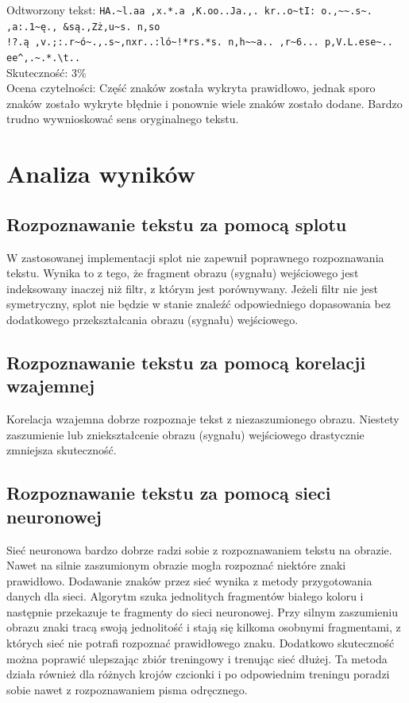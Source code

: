 \documentclass{article}
\begin{document}
Odtworzony tekst: \verb|HA.~l.aa ,x.*.a ,K.oo..Ja.,. kr..o~tI: o.,~~.s~. ,a:.1~ę., &są.,Zż,u~s. n,so| \\
\verb|!?.ą ,v.;:.r~ó~.,.s~,nxr..:ló~!*rs.*s. n,h~~a.. ,r~6... p,V.L.ese~.. ee^,.~.*.\t..| \\
Skuteczność: 3\% \\
Ocena czytelności: Część znaków została wykryta prawidłowo, jednak sporo znaków zostało wykryte błędnie i ponownie wiele znaków zostało dodane. Bardzo trudno wywnioskować sens oryginalnego tekstu.

\clearpage

\section{Analiza wyników}
\subsection{Rozpoznawanie tekstu za pomocą splotu}
W zastosowanej implementacji splot nie zapewnił poprawnego rozpoznawania tekstu. Wynika to z tego, że fragment obrazu (sygnału) wejściowego jest indeksowany inaczej niż filtr, z którym jest porównywany. Jeżeli filtr nie jest symetryczny, splot nie będzie w stanie znaleźć odpowiedniego dopasowania bez dodatkowego przekształcania obrazu (sygnału) wejściowego.

\subsection{Rozpoznawanie tekstu za pomocą korelacji wzajemnej}
Korelacja wzajemna dobrze rozpoznaje tekst z niezaszumionego obrazu. Niestety zaszumienie lub zniekształcenie obrazu (sygnału) wejściowego drastycznie zmniejsza skuteczność.

\subsection{Rozpoznawanie tekstu za pomocą sieci neuronowej}
Sieć neuronowa bardzo dobrze radzi sobie z rozpoznawaniem tekstu na obrazie. Nawet na silnie zaszumionym obrazie mogła rozpoznać niektóre znaki prawidłowo. Dodawanie znaków przez sieć wynika z metody przygotowania danych dla sieci. Algorytm szuka jednolitych fragmentów białego koloru i następnie przekazuje te fragmenty do sieci neuronowej. Przy silnym zaszumieniu obrazu znaki tracą swoją jednolitość i stają się kilkoma osobnymi fragmentami, z których sieć nie potrafi rozpoznać prawidłowego znaku. Dodatkowo skuteczność można poprawić ulepszając zbiór treningowy i trenując sieć dłużej. Ta metoda działa również dla różnych krojów czcionki i po odpowiednim treningu poradzi sobie nawet z rozpoznawaniem pisma odręcznego.
\end{document}
